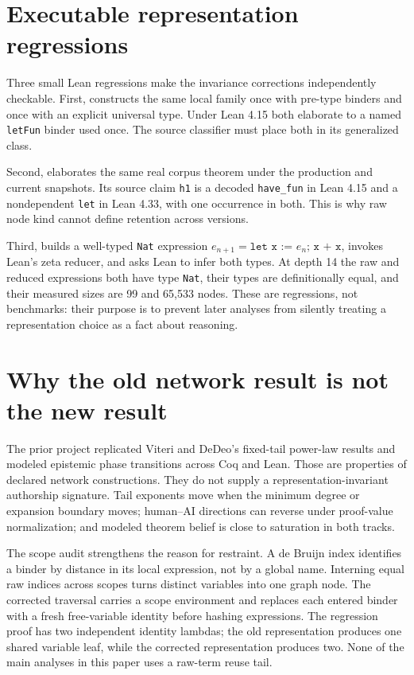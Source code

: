 \documentclass[10pt]{article}
\newcommand{\code}[1]{\texttt{#1}}
\begin{document}
\section{Executable representation regressions}

Three small Lean regressions make the invariance corrections independently checkable.  First,
 constructs the same local family once with pre-type binders and
once with an explicit universal type.  Under Lean 4.15 both elaborate to a named \code{letFun}
binder used once.  The source classifier must place both in its generalized class.

Second,  elaborates the same real corpus theorem under
the production and current snapshots.  Its source claim \code{h1} is a decoded \code{have\_fun} in
Lean 4.15 and a nondependent \code{let} in Lean 4.33, with one occurrence in both.  This is why raw
node kind cannot define retention across versions.

Third,  builds a well-typed \code{Nat} expression
$e_{n+1}=\code{let x := }e_n\code{; x + x}$, invokes Lean's zeta reducer, and asks Lean to infer both
types.  At depth 14 the raw and reduced expressions both have type \code{Nat}, their types are
definitionally equal, and their measured sizes are 99 and 65,533 nodes.  These are regressions, not
benchmarks: their purpose is to prevent later analyses from silently treating a representation
choice as a fact about reasoning.

\section{Why the old network result is not the new result}

The prior project replicated Viteri and DeDeo's fixed-tail power-law results and modeled epistemic
phase transitions across Coq and Lean.  Those are properties of declared network constructions.
They do not supply a representation-invariant authorship signature.  Tail exponents move when the
minimum degree or expansion boundary moves; human--AI directions can reverse under proof-value
normalization; and modeled theorem belief is close to saturation in both tracks.

The scope audit strengthens the reason for restraint.  A de Bruijn index identifies a binder by
distance in its local expression, not by a global name.  Interning equal raw indices across scopes
turns distinct variables into one graph node.  The corrected traversal carries a scope environment
and replaces each entered binder with a fresh free-variable identity before hashing expressions.
The regression proof has two independent identity lambdas; the old representation produces one
shared variable leaf, while the corrected representation produces two.  None of the main analyses
in this paper uses a raw-term reuse tail.
\end{document}
